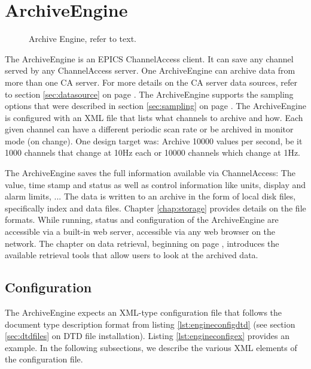 \chapter{ArchiveEngine} \label{sec:engine}

\begin{figure}[htb]
\begin{center}
\end{center}
\caption{\label{fig:engine}Archive Engine, refer to text.}
\end{figure}

\noindent The ArchiveEngine is an EPICS ChannelAccess client. It can
save any channel served by any ChannelAccess server. One ArchiveEngine
can archive data from more than one CA server. For more details on the
CA server data sources, refer to section \ref{sec:datasource} on page
\pageref{sec:datasource}.  The ArchiveEngine supports the sampling
options that were described in section \ref{sec:sampling} on page
\pageref{sec:sampling}.  The ArchiveEngine is configured with an XML
file that lists what channels to archive and how. Each given channel
can have a different periodic scan rate or be archived in monitor mode
(on change).  One design target was: Archive 10000 values per second,
be it 1000 channels that change at 10Hz each or 10000 channels which
change at 1Hz.

The ArchiveEngine saves the full information available via
ChannelAccess: The value, time stamp and status as well as
control information like units, display and alarm limits, ...  
The data is written to an archive in the form of local disk files,
specifically index and data files.  Chapter \ref{chap:storage}
provides details on the file formats.
While running, status and configuration of the ArchiveEngine are
accessible via a built-in web server, accessible via any web browser
on the network.  The chapter on data retrieval, beginning on page
\pageref{chap:retrieval}, introduces the available retrieval tools
that allow users to look at the archived data.

\section{Configuration} \label{sec:engineconfig}
The ArchiveEngine expects an XML-type configuration file that follows
the document type description format from listing
\ref{lst:engineconfigdtd} (see section \ref{sec:dtdfiles} on DTD file
installation). Listing \ref{lst:engineconfigex} provides an
example. In the following subsections, we describe the various XML
elements of the configuration file.


